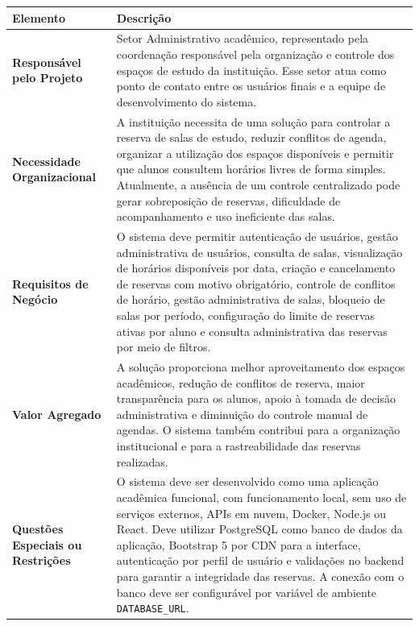 \documentclass[12pt,a4paper]{article}
\begin{document}
\begin{longtable}{|p{5cm}|p{10cm}|}
\hline
\textbf{Elemento} & \textbf{Descrição} \\ \hline

\textbf{Responsável pelo Projeto} &
Setor Administrativo acadêmico, representado pela coordenação responsável pela organização e controle dos espaços de estudo da instituição. Esse setor atua como ponto de contato entre os usuários finais e a equipe de desenvolvimento do sistema. \\ \hline

\textbf{Necessidade Organizacional} &
A instituição necessita de uma solução para controlar a reserva de salas de estudo, reduzir conflitos de agenda, organizar a utilização dos espaços disponíveis e permitir que alunos consultem horários livres de forma simples. Atualmente, a ausência de um controle centralizado pode gerar sobreposição de reservas, dificuldade de acompanhamento e uso ineficiente das salas. \\ \hline

\textbf{Requisitos de Negócio} &
O sistema deve permitir autenticação de usuários, gestão administrativa de usuários, consulta de salas, visualização de horários disponíveis por data, criação e cancelamento de reservas com motivo obrigatório, controle de conflitos de horário, gestão administrativa de salas, bloqueio de salas por período, configuração do limite de reservas ativas por aluno e consulta administrativa das reservas por meio de filtros. \\ \hline

\textbf{Valor Agregado} &
A solução proporciona melhor aproveitamento dos espaços acadêmicos, redução de conflitos de reserva, maior transparência para os alunos, apoio à tomada de decisão administrativa e diminuição do controle manual de agendas. O sistema também contribui para a organização institucional e para a rastreabilidade das reservas realizadas. \\ \hline

\textbf{Questões Especiais ou Restrições} &
O sistema deve ser desenvolvido como uma aplicação acadêmica funcional, com funcionamento local, sem uso de serviços externos, APIs em nuvem, Docker, Node.js ou React. Deve utilizar PostgreSQL como banco de dados da aplicação, Bootstrap 5 por CDN para a interface, autenticação por perfil de usuário e validações no backend para garantir a integridade das reservas. A conexão com o banco deve ser configurável por variável de ambiente \texttt{DATABASE\_URL}. \\ \hline

\end{longtable}
\end{document}
